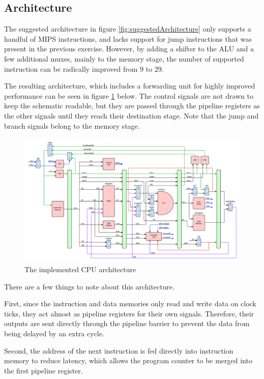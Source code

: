 \subsection{Architecture}

The suggested architecture in figure \ref{fig:suggestedArchitecture} only supports a handful of MIPS instructions, and lacks support for jump instructions that was present in the previous exercise.
However, by adding a shifter to the ALU and a few additional muxes, mainly to the memory stage, the number of supported instruction can be radically improved from 9 to 29.

The resulting architecture, which includes a forwarding unit for highly improved performance can be seen in figure \ref{fig:cpuArchitecture} below.
The control signals are not drawn to keep the schematic readable, but they are passed through the pipeline registers as the other signals until they reach their destination stage.
Note that the jump and branch signals belong to the memory stage.

\begin{figure}[ht]
    \centering
    \includegraphics[width=\textwidth]{figures/Architecture.png}
    \caption{The implemented CPU architecture} 
    \label{fig:cpuArchitecture}
\end{figure}

There are a few things to note about this architecture.

First, since the instruction and data memories only read and write data on clock ticks, they act almost as pipeline registers for their own signals.
Therefore, their outputs are sent directly through the pipeline barrier to prevent the data from being delayed by an extra cycle.

Second, the address of the next instruction is fed directly into instruction memory to reduce latency, which allows the program counter to be merged into the first pipeline register.

